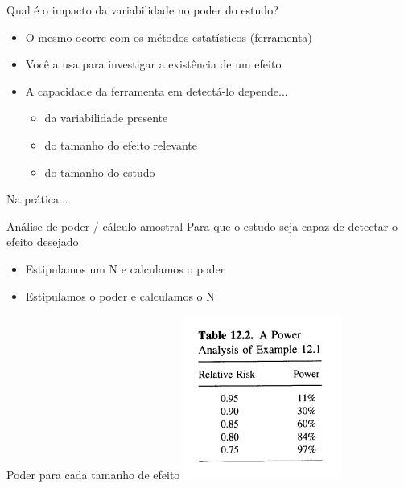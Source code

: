 \documentclass{beamer}
\begin{document}
\begin{frame}
  \begin{center}
    Qual é o impacto da variabilidade no poder do estudo?
  \end{center}
\end{frame}


\begin{frame}{\scriptsize }
  \begin{itemize}
    \footnotesize
  \item O mesmo ocorre com os métodos estatísticos (ferramenta)
    \bigskip
  \item<2-> Você a usa para investigar a existência de um efeito
    \bigskip
  \item<3-> A capacidade da ferramenta em detectá-lo depende...
    \begin{itemize}
      \scriptsize
    \item<3-> da variabilidade presente 
      \smallskip
    \item<3-> do tamanho do efeito relevante 
      \smallskip
    \item<3-> do tamanho do estudo 
    \end{itemize}
  \end{itemize}
\end{frame}

\begin{frame}{\scriptsize Na prática...}
    \begin{block}{\scriptsize Análise de poder / cálculo amostral}
    \scriptsize
    Para que o estudo seja capaz de detectar o efeito desejado
    \medskip
    \begin{itemize}
      \scriptsize
    \item Estipulamos um N e calculamos o poder %
    \item Estipulamos o poder e calculamos o N %
    \end{itemize}
  \end{block}
  \bigskip
  \bigskip
  \begin{exampleblock}{\scriptsize Poder para cada tamanho de efeito}
    \centering
    \includegraphics[height=.4\textheight]{Cap10-11/tab12_2-power_by_effect}
  \end{exampleblock}
\end{frame}
\end{document}
